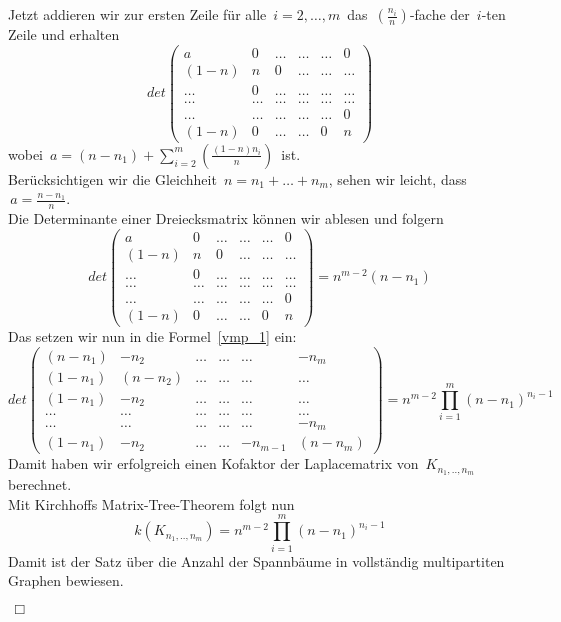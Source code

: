 Jetzt addieren wir zur ersten Zeile für alle $\,i=2,\ldots,m\,$ das $\,\left(\frac{n_i}{n}\right)$-fache der $\,i$-ten Zeile und erhalten
\begin{equation}
det
\begin{pmatrix}
 a&0&\ldots&\ldots&\ldots&0\\
 (1-n)&n&0&\ldots&\ldots&\ldots\\
 \ldots&0&\ldots&\ldots&\ldots&\ldots\\
 \ldots&\ldots&\ldots&\ldots&\ldots&\ldots\\
 \ldots&\ldots&\ldots&\ldots&\ldots&0\\
 (1-n)&0&\ldots&\ldots&0&n
\end{pmatrix}
\end{equation}
wobei $\,a = (n-n_1)+\sum_{i=2}^m\left(\frac{(1-n)n_i}{n}\right)\,$ ist.\\
Berücksichtigen wir die Gleichheit $\,n=n_1+\ldots+n_m$,\; sehen wir leicht, dass $\,a=\frac{n-n_1}{n}$.\; \\
Die Determinante einer Dreiecksmatrix können wir ablesen und folgern
\begin{equation}
det
\begin{pmatrix}
 a&0&\ldots&\ldots&\ldots&0\\
 (1-n)&n&0&\ldots&\ldots&\ldots\\
 \ldots&0&\ldots&\ldots&\ldots&\ldots\\
 \ldots&\ldots&\ldots&\ldots&\ldots&\ldots\\
 \ldots&\ldots&\ldots&\ldots&\ldots&0\\
 (1-n)&0&\ldots&\ldots&0&n
\end{pmatrix}
= n^{m-2}(n-n_1)
\end{equation}
Das setzen wir nun in die Formel~\ref{vmp_1} ein:
\begin{equation}
 det
\begin{pmatrix}
 (n-n_1)&-n_2&\ldots&\ldots&\ldots&-n_m\\
 (1-n_1)&(n-n_2)&\ldots&\ldots&\ldots&\ldots\\
 (1-n_1)&-n_2&\ldots&\ldots&\ldots&\ldots\\
 \ldots&\ldots&\ldots&\ldots&\ldots&\ldots\\
 \ldots&\ldots&\ldots&\ldots&\ldots&-n_m\\
 (1-n_1)&-n_2&\ldots&\ldots&-n_{m-1}&(n-n_m)
\end{pmatrix}
= n^{m-2}\prod_{i=1}^{m}(n-n_1)^{n_i-1}
\end{equation}
Damit haben wir erfolgreich einen Kofaktor der Laplacematrix von $\,K_{n_1,..,n_m}\,$ berechnet.\\
Mit Kirchhoffs Matrix-Tree-Theorem folgt nun
\begin{equation}
 \mathit{k}(K_{n_1,..,n_m})=n^{m-2}\prod_{i=1}^{m}(n-n_1)^{n_i-1}
\end{equation}
Damit ist der Satz über die Anzahl der Spannbäume in vollständig multipartiten Graphen bewiesen.
\begin{flushright} $\,\Box\,$ \end{flushright}
